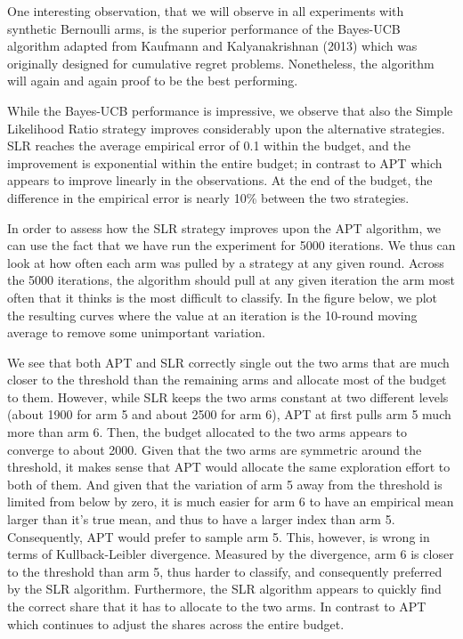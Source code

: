 \documentclass[12pt,]{article}
\begin{document}
One interesting observation, that we will observe in all experiments
with synthetic Bernoulli arms, is the superior performance of the
Bayes-UCB algorithm adapted from Kaufmann and Kalyanakrishnan (2013)
which was originally designed for cumulative regret problems.
Nonetheless, the algorithm will again and again proof to be the best
performing.

While the Bayes-UCB performance is impressive, we observe that also the
Simple Likelihood Ratio strategy improves considerably upon the
alternative strategies. SLR reaches the average empirical error of 0.1
within the budget, and the improvement is exponential within the entire
budget; in contrast to APT which appears to improve linearly in the
observations. At the end of the budget, the difference in the empirical
error is nearly 10\% between the two strategies.

In order to assess how the SLR strategy improves upon the APT algorithm,
we can use the fact that we have run the experiment for 5000 iterations.
We thus can look at how often each arm was pulled by a strategy at any
given round. Across the 5000 iterations, the algorithm should pull at
any given iteration the arm most often that it thinks is the most
difficult to classify. In the figure below, we plot the resulting curves
where the value at an iteration is the 10-round moving average to remove
some unimportant variation.

We see that both APT and SLR correctly single out the two arms that are
much closer to the threshold than the remaining arms and allocate most
of the budget to them. However, while SLR keeps the two arms constant at
two different levels (about 1900 for arm 5 and about 2500 for arm 6),
APT at first pulls arm 5 much more than arm 6. Then, the budget
allocated to the two arms appears to converge to about 2000. Given that
the two arms are symmetric around the threshold, it makes sense that APT
would allocate the same exploration effort to both of them. And given
that the variation of arm 5 away from the threshold is limited from
below by zero, it is much easier for arm 6 to have an empirical mean
larger than it's true mean, and thus to have a larger index than arm 5.
Consequently, APT would prefer to sample arm 5. This, however, is wrong
in terms of Kullback-Leibler divergence. Measured by the divergence, arm
6 is closer to the threshold than arm 5, thus harder to classify, and
consequently preferred by the SLR algorithm. Furthermore, the SLR
algorithm appears to quickly find the correct share that it has to
allocate to the two arms. In contrast to APT which continues to adjust
the shares across the entire budget.
\end{document}
